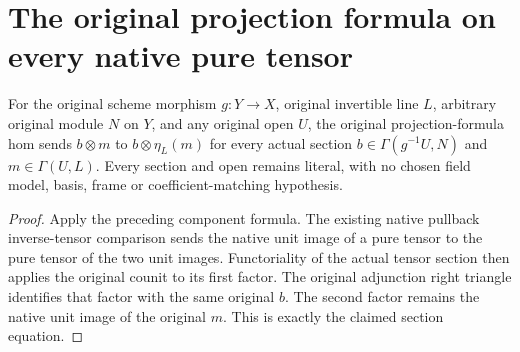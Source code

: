\section{The original projection formula on every native pure tensor}

\begin{lemma}
\label{lem:line-pf-native-pure-tensor-readback}
\leanok
For the original scheme morphism $g:Y\to X$, original invertible line
$L$, arbitrary original module $N$ on $Y$, and any original open $U$,
the original projection-formula hom sends
$b\otimes m$ to $b\otimes\eta_L(m)$ for every actual section
$b\in\Gamma(g^{-1}U,N)$ and $m\in\Gamma(U,L)$.
Every section and open remains literal, with no chosen field model,
basis, frame or coefficient-matching hypothesis.
\end{lemma}
\begin{proof}
Apply the preceding component formula.  The existing native pullback
inverse-tensor comparison sends the native unit image of a pure tensor
to the pure tensor of the two unit images.  Functoriality of the actual
tensor section then applies the original counit to its first factor.
The original adjunction right triangle identifies that factor with the
same original $b$.  The second factor remains the native unit image of
the original $m$.  This is exactly the claimed section equation.
\end{proof}
